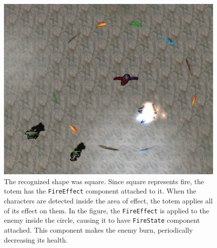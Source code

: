 \begin{figure}[p]
\centering
\includegraphics[width=.9\linewidth]{ext/scr/komix6.png}
\caption{The recognized shape was square. Since square represents fire, the totem has the \texttt{FireEffect} component attached to it. When the characters are detected inside the area of effect, the totem applies all of its effect on them. In the figure, the \texttt{FireEffect} is applied to the enemy inside the circle, causing it to have \texttt{FireState} component attached. This component makes the enemy burn, periodically decreasing its health.}
\label{fig:effect}
\end{figure}